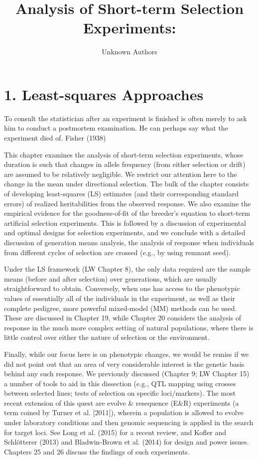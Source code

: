 \documentclass{article}
\title{Analysis of Short-term Selection Experiments:}
\author{Unknown Authors}
\date{}
\begin{document}
\maketitle

\begin{abstract}

\end{abstract}

\section{1. Least-squares Approaches}
To consult the statistician after an experiment is finished is often merely to ask him to conduct a postmortem examination. He can perhaps say what the experiment died of. Fisher (1938)

This chapter examines the analysis of short-term selection experiments, whose duration is such that changes in allele frequency (from either selection or drift) are assumed to be relatively negligible. We restrict our attention here to the change in the mean under directional selection. The bulk of the chapter consists of developing least-squares (LS) estimates (and their corresponding standard errors) of realized heritabilities from the observed response. We also examine the empirical evidence for the goodness-of-fit of the breeder's equation to short-term artificial selection experiments. This is followed by a discussion of experimental and optimal designs for selection experiments, and we conclude with a detailed discussion of generation means analysis, the analysis of response when individuals from different cycles of selection are crossed (e.g., by using remnant seed).

Under the LS framework (LW Chapter 8), the only data required are the sample means (before and after selection) over generations, which are usually straightforward to obtain. Conversely, when one has access to the phenotypic values of essentially all of the individuals in the experiment, as well as their complete pedigree, more powerful mixed-model (MM) methods can be used. These are discussed in Chapter 19, while Chapter 20 considers the analysis of response in the much more complex setting of natural populations, where there is little control over either the nature of selection or the environment.

Finally, while our focus here is on phenotypic changes, we would be remiss if we did not point out that an area of very considerable interest is the genetic basis behind any such response. We previously discussed (Chapter 9; LW Chapter 15) a number of tools to aid in this dissection (e.g., QTL mapping using crosses between selected lines; tests of selection on specific loci/markers). The most recent extension of this quest are evolve & resequence (E&R) experiments (a term coined by Turner et al. [2011]), wherein a population is allowed to evolve under laboratory conditions and then genomic sequencing is applied in the search for target loci. See Long et al. (2015) for a recent review, and Kofler and Schlötterer (2013) and Bladwin-Brown et al. (2014) for design and power issues. Chapters 25 and 26 discuss the findings of such experiments.
\end{document}
